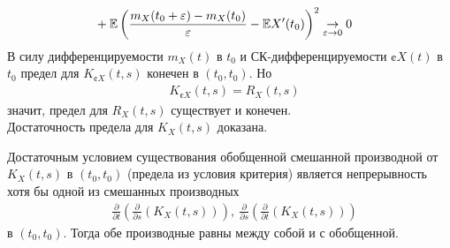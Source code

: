 \begin{Proof}
\begin{itemize}
\begin{align*}
          & + \mathbb{E} \left( \frac{m_X(t_0 +\varepsilon) - m_X(t_0)}{\varepsilon} - \mathbb{E} X'(t_0) \right)^2 \underset{\varepsilon \to 0}\rightarrow 0
        \end{align*}
        В силу дифференцируемости $m_X(t)$ в $t_0$ и СК-дифференцируемости
        $\cent{X}(t)$ в $t_0$ предел для $K_{\cent{X}}(t,s)$ конечен в
        $(t_0,t_0)$. Но
        \begin{align*}
          & K_{\cent{X}}(t,s) = R_X(t,s)
        \end{align*}
        значит, предел для $R_X(t,s)$ существует и конечен.
        \\
        Достаточность предела для $K_X(t,s)$ доказана.
    \end{itemize}
\end{Proof}
\begin{Note}
    Достаточным условием существования обобщенной смешанной производной от
    $K_X(t,s)$ в $(t_0,t_0)$ (предела из условия критерия) является
    непрерывность хотя бы одной из смешанных производных
    \begin{align*}
      & \frac{\partial}{\partial t}\left( \frac{\partial}{\partial s} \left( K_X(t,s) \right) \right), \ \frac{\partial}{\partial s}\left( \frac{\partial}{\partial t} \left( K_X(t,s) \right) \right)
    \end{align*}
    в $(t_0,t_0)$. Тогда обе производные равны между собой и с обобщенной.
\end{Note}
